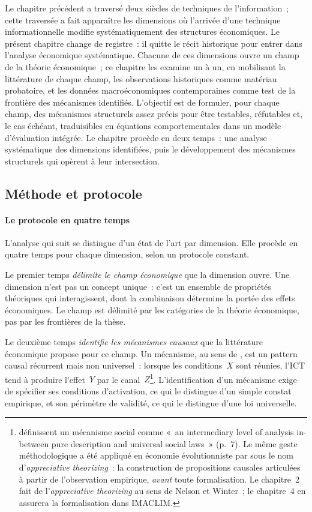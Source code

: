 Le chapitre précédent a traversé deux siècles de techniques de l'information~; cette traversée a fait apparaître les dimensions où l'arrivée d'une technique informationnelle modifie systématiquement des structures économiques. Le présent chapitre change de registre~: il quitte le récit historique pour entrer dans l'analyse économique systématique. Chacune de ces dimensions ouvre un champ de la théorie économique~; ce chapitre les examine un à un, en mobilisant la littérature de chaque champ, les observations historiques comme matériau probatoire, et les données macroéconomiques contemporaines comme test de la frontière des mécanismes identifiés. L'objectif est de formuler, pour chaque champ, des mécanismes structurels assez précis pour être testables, réfutables et, le cas échéant, traduisibles en équations comportementales dans un modèle d'évaluation intégrée. Le chapitre procède en deux temps~: une analyse systématique des dimensions identifiées, puis le développement des mécanismes structurels qui opèrent à leur intersection.

\subsection*{Méthode et protocole}\label{subsec:methode-ch2}

\paragraph{Le protocole en quatre temps} L'analyse qui suit se distingue d'un état de l'art par dimension. Elle procède en quatre temps pour chaque dimension, selon un protocole constant.

Le premier temps \emph{délimite le champ économique} que la dimension ouvre. Une dimension n'est pas un concept unique~: c'est un ensemble de propriétés théoriques qui interagissent, dont la combinaison détermine la portée des effets économiques. Le champ est délimité par les catégories de la théorie économique, pas par les frontières de la thèse.

Le deuxième temps \emph{identifie les mécanismes causaux} que la littérature économique propose pour ce champ. Un mécanisme, au sens de \textcite{hedstrom_social_1998}, est un pattern causal récurrent mais non universel~: lorsque les conditions~$X$ sont réunies, l'ICT tend à produire l'effet~$Y$ par le canal~$Z$\footnote{\textcite{hedstrom_social_1998} définissent un mécanisme social comme «~an intermediary level of analysis in-between pure description and universal social laws~» (p.~7). Le même geste méthodologique a été appliqué en économie évolutionniste par \textcite{nelson_winter_1982} sous le nom d'\emph{appreciative theorizing}~: la construction de propositions causales articulées à partir de l'observation empirique, \emph{avant} toute formalisation. Le chapitre~2 fait de l'\emph{appreciative theorizing} au sens de Nelson et Winter~; le chapitre~4 en assurera la formalisation dans IMACLIM.}. L'identification d'un mécanisme exige de spécifier ses conditions d'activation, ce qui le distingue d'un simple constat empirique, et son périmètre de validité, ce qui le distingue d'une loi universelle.


